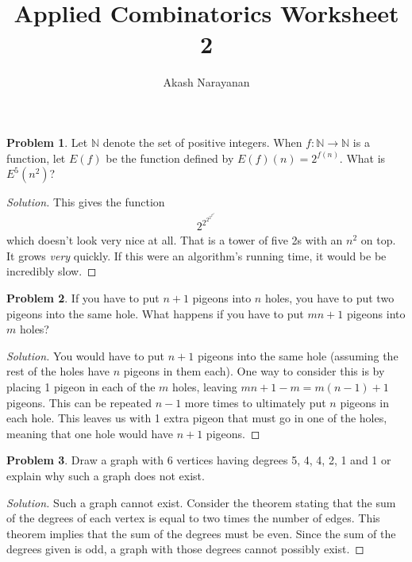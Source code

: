 \documentclass[12pt]{article}
\title{Applied Combinatorics Worksheet 2}
\author{Akash Narayanan}
\theoremstyle{definition}
\newtheorem{problem-internal}{Problem}[]
\newenvironment{problem}{
  \medskip
  \begin{problem-internal}
}{
\end{problem-internal}
}
\newenvironment{solution}{
  \begin{proof}[Solution]
    \vspace{-8px}
    \setlength{\parskip}{4px}
    \setlength{\parindent}{0px}
}{
\end{proof}
}
\begin{document}
  \maketitle

  \begin{problem}
    Let \(\mathbb{N}\) denote the set of positive integers. When \( f : \mathbb{N} \rightarrow \mathbb{N} \) is a function, let \(E(f)\) be the function defined by \(E(f)(n) = 2^{f(n)}\). What is \(E^{5}(n^{2})\)?
  \end{problem}

  \begin{solution}
    This gives the function
    \begin{align*}
      2^{2^{2^{2^{2^{n^{2}}}}}}
    \end{align*}
    which doesn't look very nice at all. That is a tower of five 2s with an \(n^2\) on top. It grows \textit{very} quickly. If this were an algorithm's running time, it would be be incredibly slow.
  \end{solution}

  \begin{problem}
    If you have to put \(n + 1\) pigeons into \(n\) holes, you have to put two pigeons into the same hole. What happens if you have to put \(mn + 1\) pigeons into \(m\) holes?
  \end{problem}

  \begin{solution}
    You would have to put \(n + 1\) pigeons into the same hole (assuming the rest of the holes have \(n\) pigeons in them each). One way to consider this is by placing 1 pigeon in each of the \(m\) holes, leaving \(mn + 1 - m = m(n-1) + 1\) pigeons. This can be repeated \(n-1\) more times to ultimately put \(n\) pigeons in each hole. This leaves us with 1 extra pigeon that must go in one of the holes, meaning that one hole would have \(n+1\) pigeons.
  \end{solution}

  \begin{problem}
    Draw a graph with 6 vertices having degrees 5, 4, 4, 2, 1 and 1 or explain why such a graph does not exist.
  \end{problem}

  \begin{solution}
    Such a graph cannot exist. Consider the theorem stating that the sum of the degrees of each vertex is equal to two times the number of edges. This theorem implies that the sum of the degrees must be even. Since the sum of the degrees given is odd, a graph with those degrees cannot possibly exist.
  \end{solution}
\end{document}
